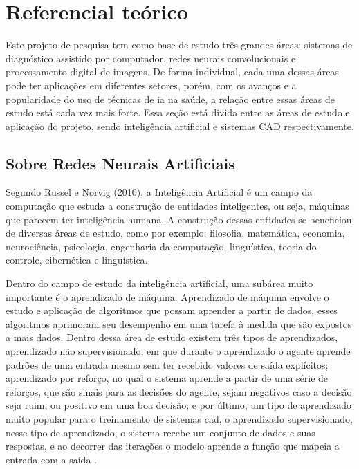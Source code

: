 \section{Referencial teórico}

Este projeto de pesquisa tem como base de estudo três grandes áreas: sistemas de diagnóstico assistido por computador, redes neurais convolucionais e processamento digital de imagens. De forma individual, cada uma dessas áreas pode ter aplicações em diferentes setores, porém, com os avanços e a popularidade do uso de técnicas de \gls{ia} na saúde, a relação entre essas áreas de estudo está cada vez mais forte. Essa seção está divida entre as áreas de estudo e aplicação do projeto, sendo inteligência artificial e sistemas CAD respectivamente.


\subsection{Sobre Redes Neurais Artificiais}

Segundo Russel e Norvig (2010), a Inteligência Artificial  é um campo da computação que estuda a construção de entidades inteligentes, ou seja, máquinas que parecem ter inteligência humana. A construção dessas entidades se beneficiou de diversas áreas de estudo, como por exemplo: filosofia, matemática, economia, neurociência, psicologia, engenharia da computação, linguística, teoria do controle, cibernética e linguística.


Dentro do campo de estudo da inteligência artificial, uma subárea muito importante é o aprendizado de máquina. Aprendizado de máquina envolve o estudo e aplicação de algoritmos que possam aprender a partir de dados, esses algoritmos aprimoram seu desempenho em uma tarefa à medida que são expostos a mais dados. Dentro dessa área de estudo existem três tipos de aprendizados, aprendizado não supervisionado, em que durante o aprendizado o agente aprende padrões de uma entrada mesmo sem ter recebido valores de saída explícitos; aprendizado por reforço, no qual o sistema aprende a partir de uma série de reforços, que são sinais para as decisões do agente, sejam negativos caso a decisão seja ruim, ou positivo em uma boa decisão; e por último, um tipo de aprendizado muito popular para o treinamento de sistemas \gls{cad}, o aprendizado supervisionado, nesse tipo de aprendizado, o sistema recebe um conjunto de dados e suas respostas, e ao decorrer das iterações o modelo aprende a função que mapeia a entrada com a saída \cite{haykin2009neural}.

